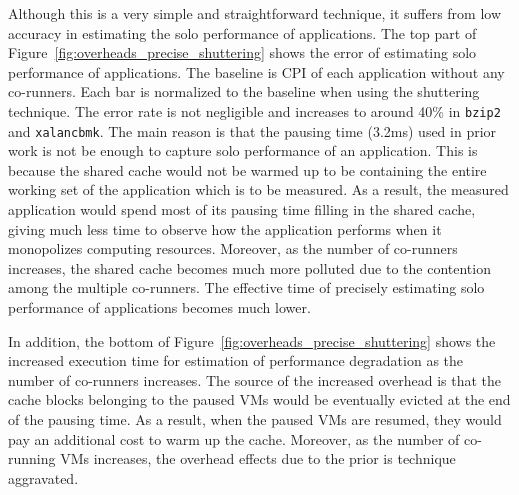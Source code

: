 \documentclass{sig-alternate}
\begin{document}
Although this is a very simple and straightforward technique, it suffers from low accuracy in estimating the solo performance of applications. The top part of Figure~\ref{fig:overheads_precise_shuttering} shows the error of estimating solo performance of applications. The baseline is CPI of each application without any co-runners. Each bar is normalized to the baseline when using the shuttering technique. The error rate is not negligible and increases to around 40\% in \texttt{bzip2} and \texttt{xalancbmk}. The main reason is that the pausing time (3.2ms) used in prior work is not be enough to capture solo performance of an application. This is because the shared cache would not be warmed up to be containing the entire working set of the application which is to be measured. As a result, the measured application would spend most of its pausing time filling in the shared cache, giving much less time to observe how the application performs when it monopolizes computing resources. Moreover, as the number of co-runners increases, the shared cache becomes much more polluted due to the contention among the multiple co-runners. The effective time of precisely estimating solo performance of applications becomes much lower.

In addition, the bottom of Figure~\ref{fig:overheads_precise_shuttering} shows the increased execution time for estimation of performance degradation as the number of co-runners increases. The source of the increased overhead is that the cache blocks belonging to the paused VMs would be eventually evicted at the end of the pausing time. As a result, when the paused VMs are resumed, they would pay an additional cost to warm up the cache. Moreover, as the number of co-running VMs increases, the overhead effects due to the prior is technique aggravated.



\end{document}
